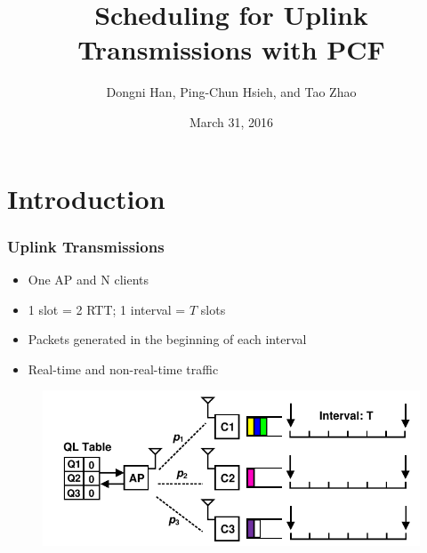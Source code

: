 \documentclass{beamer}
\begin{document}
\title{Scheduling for Uplink Transmissions with PCF}
\author{Dongni Han, Ping-Chun Hsieh, and Tao Zhao}
\date{March 31, 2016}
\newtheorem{thm}{Theorem} 
\begin{frame}
\titlepage
\end{frame}





\section{Introduction}

\begin{frame}
\frametitle{Uplink Transmissions}
\begin{itemize}
\item One AP and N clients
\item 1 slot = 2 RTT; 1 interval = $T$ slots
\item Packets generated in the beginning of each interval
\item Real-time and non-real-time traffic
\end{itemize}
\begin{figure}
\centering
\includegraphics[scale=0.85]{network.pdf}
\end{figure}
\end{frame}
\end{document}
